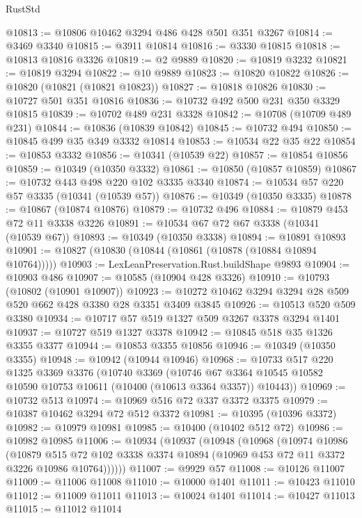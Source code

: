 \begin{lexlean}{RustStd}
\begin{coremodule}
{\begin{coremodule}
{{{{{{{{{{{{{{{{{{{{{{{{{@10813 := @10806 @10462 @3294 @486 @428 @501 @351 @3267
@10814 := @3469 @3340
@10815 := @3911 @10814
@10816 := @3330 @10815
@10818 := @10813 @10816 @3326
@10819 := @2 @9889
@10820 := @10819 @3232
@10821 := @10819 @3294
@10822 := @10 @9889
@10823 := @10820 @10822
@10826 := @10820 (@10821 (@10821 @10823))
@10827 := @10818 @10826
@10830 := @10727 @501 @351 @10816
@10836 := @10732 @492 @500 @231 @350 @3329 @10815
@10839 := @10702 @489 @231 @3328
@10842 := @10708 (@10709 @489 @231)
@10844 := @10836 (@10839 @10842)
@10845 := @10732 @494
@10850 := @10845 @499 @35 @349 @3332 @10814
@10853 := @10534 @22 @35 @22
@10854 := @10853 @3332
@10856 := @10341 (@10539 @22)
@10857 := @10854 @10856
@10859 := @10349 (@10350 @3332)
@10861 := @10850 (@10857 @10859)
@10867 := @10732 @443 @498 @220 @102 @3335 @3340
@10874 := @10534 @57 @220 @57 @3335 (@10341 (@10539 @57))
@10876 := @10349 (@10350 @3335)
@10878 := @10867 (@10874 @10876)
@10879 := @10732 @496
@10884 := @10879 @453 @72 @11 @3338 @3226
@10891 := @10534 @67 @72 @67 @3338 (@10341 (@10539 @67))
@10893 := @10349 (@10350 @3338)
@10894 := @10891 @10893
@10901 := @10827 (@10830 (@10844 (@10861 (@10878 (@10884 @10894 @10764)))))
@10903 := LexLeanPreservation.Rust.buildShape @9893
@10904 := @10903 @486
@10907 := @10585 (@10904 @428 @3326)
@10910 := @10793 (@10802 (@10901 @10907))
@10923 := @10272 @10462 @3294 @3294 @28 @509 @520 @662 @428 @3380 @28 @3351 @3409 @3845
@10926 := @10513 @520 @509 @3380
@10934 := @10717 @57 @519 @1327 @509 @3267 @3378 @3294 @1401
@10937 := @10727 @519 @1327 @3378
@10942 := @10845 @518 @35 @1326 @3355 @3377
@10944 := @10853 @3355 @10856
@10946 := @10349 (@10350 @3355)
@10948 := @10942 (@10944 @10946)
@10968 := @10733
    @517
    @220
    @1325
    @3369
    @3376
    (@10740
      @3369
      (@10746 @67 @3364 @10545 @10582 @10590 @10753 @10611 (@10400 (@10613 @3364 @3357)) @10443))
@10969 := @10732 @513
@10974 := @10969 @516 @72 @337 @3372 @3375
@10979 := @10387 @10462 @3294 @72 @512 @3372
@10981 := @10395 (@10396 @3372)
@10982 := @10979 @10981
@10985 := @10400 (@10402 @512 @72)
@10986 := @10982 @10985
@11006 := @10934
    (@10937
      (@10948
        (@10968
          (@10974
            @10986
            (@10879
              @515
              @72
              @102
              @3338
              @3374
              @10894
              (@10969 @453 @72 @11 @3372 @3226 @10986 @10764))))))
@11007 := @9929 @57
@11008 := @10126 @11007
@11009 := @11006 @11008
@11010 := @10000 @1401
@11011 := @10423 @11010
@11012 := @11009 @11011
@11013 := @10024 @1401
@11014 := @10427 @11013
@11015 := @11012 @11014
}}}}}}}}}}}}}}}}}}}}}}}}}
\end{coremodule}}
\end{coremodule}
\end{lexlean}
